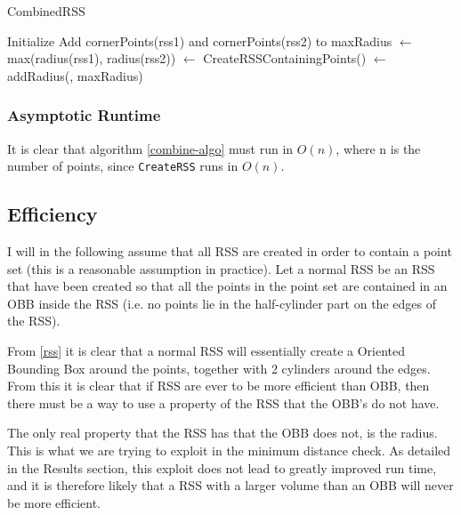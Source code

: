\begin{algorithm}[H]
  \caption{CombinedRSS}
  \label{combine-algo}
   
  \dontprintsemicolon
  Initialize \points \;
  Add cornerPoints(rss1) and cornerPoints(rss2) to \points \;
  maxRadius $\gets$ max(radius(rss1), radius(rss2)) \;
  \crss $\gets$ CreateRSSContainingPoints(\points) \;
  \crss $\gets$ addRadius(\crss, maxRadius) \;
  \return \crss
\end{algorithm}

\subsubsection{Asymptotic Runtime}
It is clear that algorithm \ref{combine-algo} must run in $O(n)$, where n is the number of points, since \texttt{CreateRSS} runs in $O(n)$. 


\subsection{Efficiency}
I will in the following assume that all RSS are created in order to contain a point set (this is a reasonable assumption in practice). Let a normal RSS be an RSS that have been created so that all the points in the point set are contained in an OBB inside the RSS (i.e. no points lie in the half-cylinder part on the edges of the RSS).  

From \ref{rss} it is clear that a normal RSS will essentially create a Oriented Bounding Box around the points, together with 2 cylinders around the edges. From this it is clear that if RSS are ever to be more efficient than OBB, then there must be a way to use a property of the RSS that the OBB's do not have. 

The only real property that the RSS has that the OBB does not, is the radius. This is what we are trying to exploit in the minimum distance check. As detailed in the Results section, this exploit does not lead to greatly improved run time, and it is therefore likely that a RSS with a larger volume than an OBB will never be more efficient.

